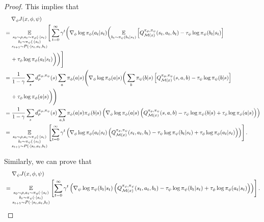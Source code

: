 \documentclass{article}
\theoremstyle{plain}
\theoremstyle{definition}
\theoremstyle{remark}
\def\E{\mathbb E}
\def\cM{\mathcal M}
\begin{document}
\begin{proof}
    This implies that
    \begin{align}
        &\quad\; \nabla_\phi J(x,\phi,\psi) \notag \\
        & = \underset{\substack{s_0 \sim \rho, a_t \sim \pi_\phi(\cdot|s_t) \\ b_t \sim \pi_\psi(\cdot|s_t) \\s_{t+1} \sim P(\cdot|s_t,a_t,b_t)}}{\E} \Bigg[\sum_{t=0}^{\infty} \gamma^t \bigg( \nabla_\phi \log \pi_\phi(a_t|s_t) \bigg(  \underset{b_t \sim \pi_\psi(b_t|s_t)}{\E} \left[Q^{\pi_\phi,\pi_\psi}_{\cM(x)}(s_t,a_t,b_t)- \tau_\psi \log \pi_\psi(b_t|s_t)  \right] \notag \\
        &\quad \,  + \tau_\phi \log \pi_\phi(a_t|s_t)\bigg) \bigg) \Bigg] \notag\\
        & = \frac{1}{1-\gamma}\sum_{s} d^{\pi_\phi,\pi_\psi}_\rho(s) \sum_{a}  \pi_\phi(a|s)\Bigg(\nabla_\phi \log \pi_\phi(a|s) \bigg(  \sum_b \pi_\psi(b|s) \left[Q^{\pi_\phi,\pi_\psi}_{\cM(x)}(s,a,b)- \tau_\psi \log \pi_\psi(b|s)  \right] \notag \\
        & \quad \, + \tau_\phi \log \pi_\phi(a|s)\bigg) \Bigg) \notag\\
        & = \frac{1}{1-\gamma}\sum_{s} d^{\pi_\phi,\pi_\psi}_\rho(s) \sum_{a,b}  \pi_\phi(a|s)\pi_\psi(b|s)\left(\nabla_\phi \log \pi_\phi(a|s) \left(  Q^{\pi_\phi,\pi_\psi}_{\cM(x)}(s,a,b)- \tau_\psi \log \pi_\psi(b|s)   + \tau_\phi \log \pi_\phi(a|s)\right) \right) \notag\\
        & = \underset{\substack{s_0 \sim \rho, a_t \sim \pi_\phi(\cdot|s_t) \\ b_t \sim \pi_\psi(\cdot|s_t) \\s_{t+1} \sim P(\cdot|s_t,a_t,b_t)}}{\E} \left[\sum_{t=0}^{\infty} \gamma^t \left( \nabla_\phi \log \pi_\phi(a_t|s_t) \left(   Q^{\pi_\phi,\pi_\psi}_{\cM(x)}(s_t,a_t,b_t)- \tau_\psi \log \pi_\psi(b_t|s_t) + \tau_\phi \log \pi_\phi(a_t|s_t)\right) \right) \right].
    \end{align}

    Similarly, we can prove that
    \begin{align}
        &\quad\; \nabla_\psi J(x,\phi,\psi) \notag \\
        & = \underset{\substack{s_0 \sim \rho, a_t \sim \pi_\phi(\cdot|s_t) \\ b_t \sim \pi_\psi(\cdot|s_t) \\s_{t+1} \sim P(\cdot|s_t,a_t,b_t)}}{\E} \left[\sum_{t=0}^{\infty} \gamma^t \left( \nabla_\psi \log \pi_\psi(b_t|s_t) \left(   Q^{\pi_\phi,\pi_\psi}_{\cM(x)}(s_t,a_t,b_t)- \tau_\psi \log \pi_\psi(b_t|s_t) + \tau_\phi \log \pi_\phi(a_t|s_t)\right) \right) \right].
    \end{align}
\end{proof}
\end{document}
